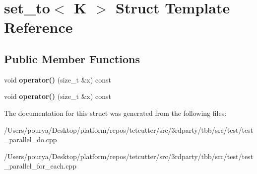 \hypertarget{structset__to}{}\section{set\+\_\+to$<$ K $>$ Struct Template Reference}
\label{structset__to}
\subsection*{Public Member Functions}
\begin{DoxyCompactItemize}
\item 
\hypertarget{structset__to_a3950761e3f6261243a96dc99326df03d}{}void {\bfseries operator()} (size\+\_\+t \&x) const \label{structset__to_a3950761e3f6261243a96dc99326df03d}

\item 
\hypertarget{structset__to_a3950761e3f6261243a96dc99326df03d}{}void {\bfseries operator()} (size\+\_\+t \&x) const \label{structset__to_a3950761e3f6261243a96dc99326df03d}

\end{DoxyCompactItemize}


The documentation for this struct was generated from the following files\+:\begin{DoxyCompactItemize}
\item 
/\+Users/pourya/\+Desktop/platform/repos/tetcutter/src/3rdparty/tbb/src/test/test\+\_\+parallel\+\_\+do.\+cpp\item 
/\+Users/pourya/\+Desktop/platform/repos/tetcutter/src/3rdparty/tbb/src/test/test\+\_\+parallel\+\_\+for\+\_\+each.\+cpp\end{DoxyCompactItemize}
